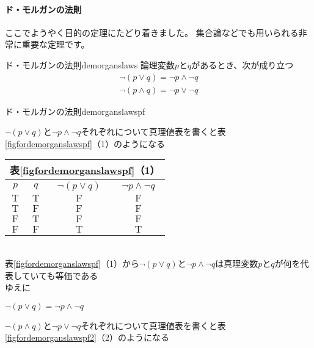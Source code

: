 \documentclass[report]{jlreq}%
\newcounter{myso}
\begin{document}
\paragraph*{ド・モルガンの法則}
ここでようやく目的の定理にたどり着きました。
集合論などでも用いられる非常に重要な定理です。
\begin{mysothm}{ド・モルガンの法則}{demorganslaws}
	論理変数$p$と$q$があるとき、次が成り立つ
	\[
	\begin{aligned}
		\neg{}(p\lor{}q)=\neg{}p\land{}\neg{}q
		\\
		\neg{}(p\land{}q)=\neg{}p\lor{}\neg{}q
	\end{aligned}
	\]
	\begin{mysoproof}{ド・モルガンの法則}{demorganslawspf}
		\begin{minipage}[h]{0.60\linewidth}
			$\neg{}(p\lor{}q)$と$\neg{}p\land{}\neg{}q$それぞれについて真理値表を書くと表\ref*{figfordemorganslawspf}（1）のようになる
		\end{minipage}
		\begin{minipage}[h]{0.45\linewidth}
			\label{figfordemorganslawspf}
			
			\begin{tabular}{|c|c|c|c|}
				\multicolumn{4}{c}{表\ref*{figfordemorganslawspf}（1）}\\
				\hline
				$p$ & $q$ & $\neg{}(p\lor{}q)$ & $\neg{}p\land{}\neg{}q$ \\
				\hline\hline
				$\mathrm{T}$ & $\mathrm{T}$ & $\mathrm{F}$ & $\mathrm{F}$\\
				\hline
				$\mathrm{T}$ & $\mathrm{F}$ & $\mathrm{F}$ & $\mathrm{F}$\\
				\hline
				$\mathrm{F}$ & $\mathrm{T}$ & $\mathrm{F}$ & $\mathrm{F}$\\
				\hline
				$\mathrm{F}$ & $\mathrm{F}$ & $\mathrm{T}$ & $\mathrm{T}$\\
				\hline
			\end{tabular}
		\end{minipage}
		\\
		表\ref*{figfordemorganslawspf}（1）から$\neg{}(p\lor{}q)$と$\neg{}p\land{}\neg{}q$は真理変数$p$と$q$が何を代表していても等価である\\
		ゆえに
		\begin{center}
		$\neg{}(p\lor{}q)=\neg{}p\land{}\neg{}q$ \\
		\end{center}
		\tcblower
		\begin{minipage}[h]{0.60\linewidth}
			$\neg{}(p\land{}q)$と$\neg{}p\lor{}\neg{}q$それぞれについて真理値表を書くと表\ref*{figfordemorganslawspf2}（2）のようになる
		\end{minipage}
		\begin{minipage}[h]{0.45\linewidth}
			\label{figfordemorganslawspf2}
			

\end{minipage}
\end{mysoproof}
\end{mysothm}
\end{document}

